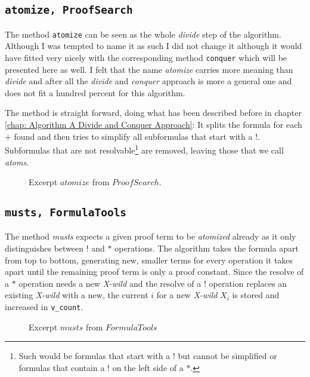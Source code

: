 \subsection[atomize]{\texttt{atomize, ProofSearch}}
The method \texttt{atomize} can be seen as the whole \emph{divide} step of the algorithm. Although I was tempted to name it as such I did not change it although it would have fitted very nicely with the corresponding method \texttt{conquer} which will be presented here as well. I felt that the name \emph{atomize} carries more meaning than \emph{divide} and after all the \emph{divide} and \emph{conquer} approach is more a general one and does not fit a hundred percent for this algorithm.

The method is straight forward, doing what has been described before in chapter \ref{chap: Algorithm A Divide and Conquer Approach}: It splits the formula for each $+$ found and then tries to simplify all subformulas that start with a $!$. Subformulas that are not resolvable\footnote{Such would be formulas that start with a $!$ but cannot be simplified or formulas that contain a $!$ on the left side of a $*$.} are removed, leaving those that we call \emph{atoms}.

\begin{figure}[H]
    \vspace{-10pt}
	
	\vspace{-10pt}
	\caption{Excerpt $atomize$ from $ProofSearch$.}
	\vspace{-10pt}
\end{figure}

\subsection[musts]{\texttt{musts, FormulaTools}}
The method \emph{musts} expects a given proof term to be \emph{atomized} already as it only distinguishes between $!$ and $*$ operations.
The algorithm takes the formula apart from top to bottom, generating new, smaller terms for every operation it takes apart until the remaining proof term is only a proof constant. Since the resolve of a $*$ operation needs a new \emph{X-wild} and the resolve of a $!$ operation replaces an existing \emph{X-wild} with a new, the current $i$ for a new \emph{X-wild} $X_i$ is stored and increased in \texttt{v\_count}.

\begin{figure}[H]
    \vspace{-10pt}
	
	\vspace{-10pt}
	\caption{Excerpt $musts$ from $FormulaTools$}
	\vspace{-10pt}
\end{figure}


